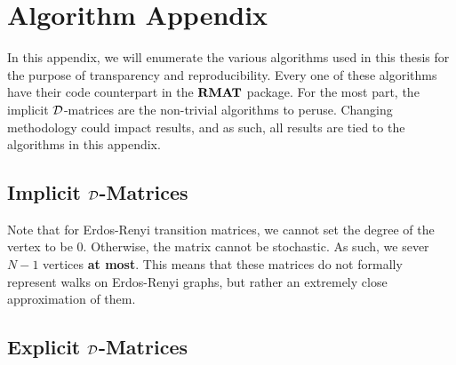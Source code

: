 
\chapter{Algorithm Appendix}

In this appendix, we will enumerate the various algorithms used in this thesis for the purpose of transparency and reproducibility. Every one of these algorithms have their code counterpart in the ${\textbf{RMAT}}$ package. For the most part, the implicit $\mathcal{D}$-matrices are the non-trivial algorithms to peruse. Changing methodology could impact results, and as such, all results are tied to the algorithms in this appendix.

\section{Implicit $\mathcal{D}$-Matrices}

\ALGstochrow

\ALGstoch


\newpage

Note that for Erdos-Renyi transition matrices, we cannot set the degree of the vertex to be $0$.
Otherwise, the matrix cannot be stochastic. As such, we sever $N - 1$ vertices \textbf{at most}.
This means that these matrices do not formally represent walks on Erdos-Renyi graphs, but rather an extremely close approximation of them.

\ALGerdos

\section{Explicit $\mathcal{D}$-Matrices}

\ALGexplicit

\ALGbeta

